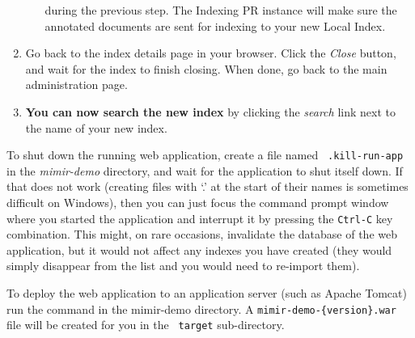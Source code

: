 \begin{enumerate}
\begin{enumerate}
    during the previous step. The \Mimir{} Indexing PR instance will make
    sure the annotated documents are sent for indexing to your new Local Index.
  \end{enumerate}
  \item Go back to the index details page in your browser. Click the {\em Close}
  button, and wait for the index to finish closing. When done, go back to the
  main administration page. 
  \item {\bf You can now search the new index} by clicking the {\em search} link
  next to the name of your new index.
\end{enumerate}

To shut down the running web application, create a file named {\tt
.kill-run-app} in the {\em mimir-demo} directory, and wait for the application
to shut itself down. If that does not work (creating files with `.' at the start
of their names is sometimes difficult on Windows), then you can just focus the
command prompt window where you started the application and interrupt it by
pressing the {\tt Ctrl-C} key combination. This might, on rare occasions,
invalidate the database of the \Mimir{} web application, but it would not affect
any indexes you have created (they would simply disappear from the list and
you would need to re-import them).

To deploy the \Mimir{} web application to an application server (such as Apache
Tomcat) run the  command in the mimir-demo directory. A
{\tt mimir-demo-\{version\}.war} file will be created for you in the {\tt
target} sub-directory.
